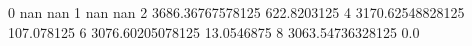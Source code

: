 0 nan nan
1 nan nan
2 3686.36767578125 622.8203125
4 3170.62548828125 107.078125
6 3076.60205078125 13.0546875
8 3063.54736328125 0.0
